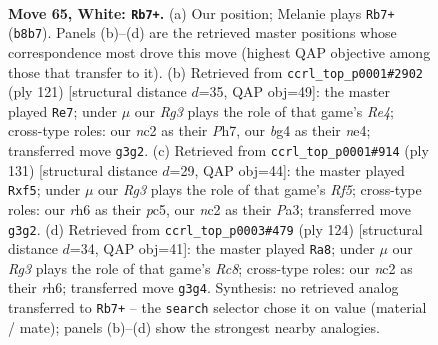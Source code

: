 \documentclass[11pt]{article}
\begin{document}
\clearpage

\begin{figure}[p]\centering
\begin{subfigure}{0.46\textwidth}\centering
\resizebox{\linewidth}{!}{%
\newchessgame
\chessboard[
  setfen={1R6/6k1/7r/8/r5bB/6R1/2n2P2/7K w - - 9 65},
  showmover=false,
  pgfstyle=straightmove, color=movearrow, markmove={b8-b7}
]}
\caption{}
\end{subfigure}\hfill
\begin{subfigure}{0.46\textwidth}\centering
\resizebox{\linewidth}{!}{%
\newchessgame
\chessboard[
  setfen={8/1Rb2k1p/8/4r3/p3N3/5KP1/8/8 b - - 1 61},
  showmover=false,
  pgfstyle=straightmove, color=movearrow, markmove={e5-e7}
]}
\caption{}
\end{subfigure}
\\[4pt]
\begin{subfigure}{0.46\textwidth}\centering
\resizebox{\linewidth}{!}{%
\newchessgame
\chessboard[
  setfen={5R2/8/8/1KP1kBp1/5r2/p7/8/8 b - - 0 66},
  showmover=false,
  pgfstyle=straightmove, color=movearrow, markmove={f4-f5}
]}
\caption{}
\end{subfigure}\hfill
\begin{subfigure}{0.46\textwidth}\centering
\resizebox{\linewidth}{!}{%
\newchessgame
\chessboard[
  setfen={2Rbk3/8/7r/8/4K1B1/7P/8/8 w - - 11 63},
  showmover=false,
  pgfstyle=straightmove, color=movearrow, markmove={c8-a8}
]}
\caption{}
\end{subfigure}
\caption{\textbf{Move 65, White: \texttt{Rb7+}.} (a) Our position; Melanie plays \texttt{Rb7+} (\texttt{b8b7}). Panels (b)--(d) are the retrieved master positions whose correspondence most drove this move (highest QAP objective among those that transfer to it). (b) Retrieved from \texttt{ccrl\_top\_p0001\#2902} (ply 121) [structural distance $d$=35, QAP obj=49]: the master played \texttt{Re7}; under $\mu$ our \emph{Rg3} plays the role of that game's \emph{Re4}; cross-type roles: our \emph{n}c2 as their \emph{P}h7, our \emph{b}g4 as their \emph{n}e4; transferred move \texttt{g3g2}. (c) Retrieved from \texttt{ccrl\_top\_p0001\#914} (ply 131) [structural distance $d$=29, QAP obj=44]: the master played \texttt{Rxf5}; under $\mu$ our \emph{Rg3} plays the role of that game's \emph{Rf5}; cross-type roles: our \emph{r}h6 as their \emph{p}c5, our \emph{n}c2 as their \emph{P}a3; transferred move \texttt{g3g2}. (d) Retrieved from \texttt{ccrl\_top\_p0003\#479} (ply 124) [structural distance $d$=34, QAP obj=41]: the master played \texttt{Ra8}; under $\mu$ our \emph{Rg3} plays the role of that game's \emph{Rc8}; cross-type roles: our \emph{n}c2 as their \emph{r}h6; transferred move \texttt{g3g4}. Synthesis: no retrieved analog transferred to \texttt{Rb7+} -- the \texttt{search} selector chose it on value (material / mate); panels (b)--(d) show the strongest nearby analogies.}
\label{fig:thought-m128}
\end{figure}
\end{document}
